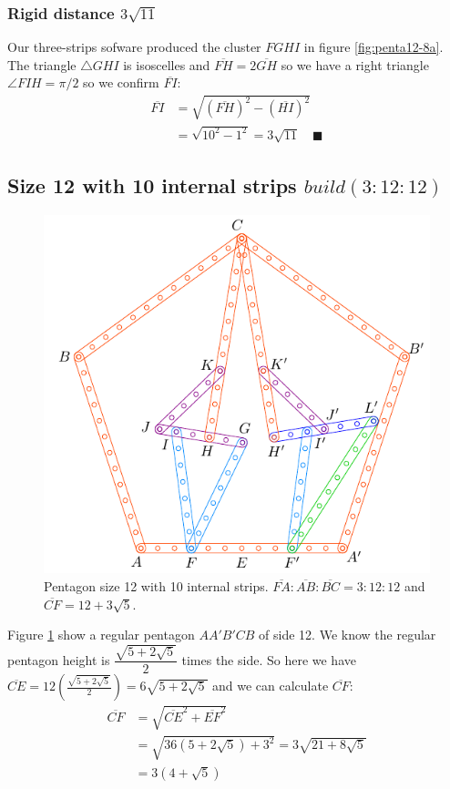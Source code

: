 \documentclass[11pt]{article}
\begin{document}
\subsubsection{Rigid distance $3\sqrt{11}$}

Our three-strips sofware produced the cluster $FGHI$ in figure \ref{fig:penta12-8a}. The triangle $\triangle{GHI}$ is isoscelles and $\overline{FH}=2\overline{GH}$ so we have a right triangle $\angle{FIH}= \pi/2$ so we confirm $\overline{FI}$:
\begin{align}
\overline{FI} &= \sqrt{(\overline{FH})^2 - (\overline{HI})^2}\nonumber\\
 &= \sqrt{10^2 - 1^2} = 3\sqrt{11} \quad \blacksquare
\end{align}

\subsection{Size 12 with 10 internal strips $build(3:12:12)$}

\begin{figure}[h]
 \centering
 \includegraphics[scale=1.1]{12/penta12-10a}
 \caption{Pentagon size 12 with 10 internal strips.  $\overline{FA}:\overline{AB}:\overline{BC} = 3:12:12$ and $\overline{CF} = 12 + 3\sqrt5$.}
 \label{fig:penta12-10a}
\end{figure}

Figure \ref{fig:penta12-10a} show a regular pentagon $AA'B'CB$ of side 12. We know the regular pentagon height is $\dfrac{\sqrt{5+2\sqrt5}}2$ times the side. So here we have $\overline{CE} = 12\left(\frac{\sqrt{5+2\sqrt5}}2\right) = 6\sqrt{5+2\sqrt5}$ and we can calculate $\overline{CF}$:
\begin{align}
\overline{CF} &= \sqrt{\overline{CE}^2 + \overline{EF}^2}\nonumber\\
 &= \sqrt{36(5+2\sqrt5) + 3^2} = 3\sqrt{21+8\sqrt5} \nonumber\\
 &= 3(4 + \sqrt5)
\end{align}
\end{document}
